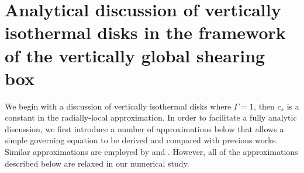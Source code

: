 \section{Analytical discussion of vertically isothermal
  disks in the framework of the vertically global shearing
  box}\label{analytical}  
We begin with a discussion of vertically isothermal disks
where $\Gamma=1$, then $c_s$ is a constant in the radially-local
approximation. 
In order to facilitate a fully analytic discussion, we first introduce a
number of approximations below that allows a simple governing equation
to be derived and compared with previous works. Similar approximations
are employed by  and . However, all of
the approximations described below are relaxed in our numerical study.     




